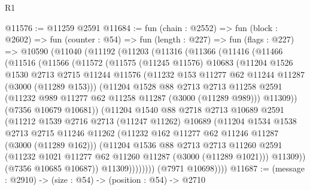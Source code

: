 \begin{lexlean}{R1}
\begin{coremodule}
@11576 := @11259 @2591
@11684 := fun (chain : @2552) =>
  fun (block : @2602) =>
  fun (counter : @54) =>
  fun (length : @227) =>
  fun (flags : @227) =>
  @10590
    (@11040
      (@11192
        (@11203
          (@11316
            (@11366
              (@11416
                (@11466
                  (@11516
                    (@11566
                      (@11572
                        (@11575
                          (@11245 @11576)
                          @10683
                          (@11204
                            @1526
                            @1530
                            @2713
                            @2715
                            @11244
                            @11576
                            (@11232 @153 @11277 @62 @11244 @11287 (@3000 (@11289 @153)))
                            (@11204
                              @1528
                              @88
                              @2713
                              @2713
                              @11258
                              @2591
                              (@11232 @989 @11277 @62 @11258 @11287 (@3000 (@11289 @989)))
                              @11309))
                          (@7356 @10679 @10681))
                        (@11204
                          @1540
                          @88
                          @2718
                          @2713
                          @10689
                          @2591
                          (@11212
                            @1539
                            @2716
                            @2713
                            (@11247 @11262)
                            @10689
                            (@11204
                              @1534
                              @1538
                              @2713
                              @2715
                              @11246
                              @11262
                              (@11232 @162 @11277 @62 @11246 @11287 (@3000 (@11289 @162)))
                              (@11204
                                @1536
                                @88
                                @2713
                                @2713
                                @11260
                                @2591
                                (@11232 @1021 @11277 @62 @11260 @11287 (@3000 (@11289 @1021)))
                                @11309))
                            (@7356 @10685 @10687))
                          @11309))))))))
          (@7971 @10698))))
@11687 := (message : @2910) -> (size : @54) -> (position : @54) -> @2710

\end{coremodule}
\end{lexlean}
